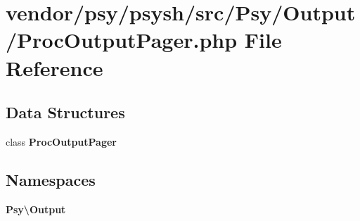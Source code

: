 \section{vendor/psy/psysh/src/\+Psy/\+Output/\+Proc\+Output\+Pager.php File Reference}
\label{_proc_output_pager_8php}
\subsection*{Data Structures}
\begin{DoxyCompactItemize}
\item 
class {\bf Proc\+Output\+Pager}
\end{DoxyCompactItemize}
\subsection*{Namespaces}
\begin{DoxyCompactItemize}
\item 
 {\bf Psy\textbackslash{}\+Output}
\end{DoxyCompactItemize}
